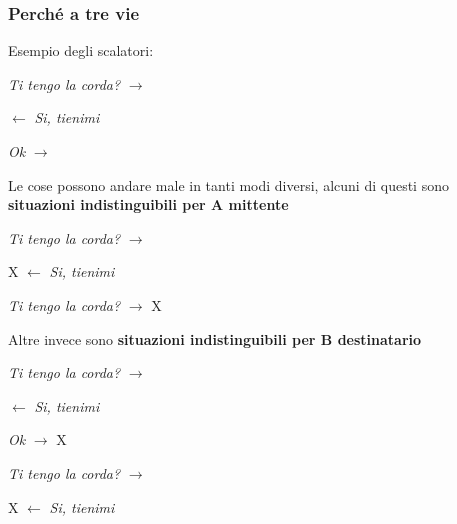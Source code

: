 \documentclass[10pt]{article}
\begin{document}
\subsubsection{Perché a tre vie}
Esempio degli scalatori:
\begin{center}
\begin{list}{}{}
\item \textit{Ti tengo la corda?} $\rightarrow$ 
\item $\leftarrow$ \textit{Si, tienimi}
\item \textit{Ok} $\rightarrow$
\end{list}
\end{center}
Le cose possono andare male in tanti modi diversi, alcuni di questi sono \textbf{situazioni indistinguibili per A mittente}
\begin{center}
	\begin{multicols}{2}
		\begin{list}{}{}
		\item \textit{Ti tengo la corda?} $\rightarrow$
		\item X $\leftarrow$ \textit{Si, tienimi}
		\item 
		\end{list}
		\begin{list}{}{}
		\item \textit{Ti tengo la corda?} $\rightarrow$ X
		\item
		\item
		\end{list}
	\end{multicols}
\end{center}
Altre invece sono \textbf{situazioni indistinguibili per B destinatario}
\begin{center}
	\begin{multicols}{2}
		\begin{list}{}{}
		\item \textit{Ti tengo la corda?} $\rightarrow$
		\item $\leftarrow$ \textit{Si, tienimi}
		\item \textit{Ok} $\rightarrow$ X
		\end{list}
		\begin{list}{}{}
		\item \textit{Ti tengo la corda?} $\rightarrow$
		\item X $\leftarrow$ \textit{Si, tienimi}
		\item 
		\end{list}
	\end{multicols}
\end{center}
\end{document}
